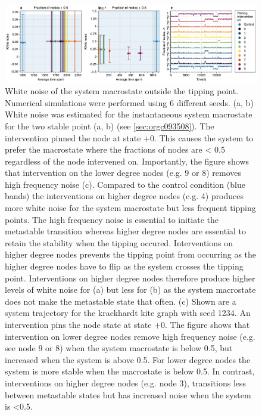 \documentclass[a4paper, 11pt, twocolumn]{article}
\begin{document}
\begin{figure}
\centering
\includegraphics[width=.9\linewidth]{./figures/figure4.pdf}
\caption{\label{fig:kite_noise}White noise of the system macrostate outside the tipping point. Numerical simulations were performed using 6 different seeds. (a, b) White noise was estimated for the instantaneous system macrostate for the two stable point (a, b) (see \ref{sec:orgc093508}). The intervention pinned the node at state +0. This causes the system to prefer the macrostate where the fractions of nodes are < 0.5 regardless of the node intervened on. Importantly, the figure shows that intervention on the lower degree nodes (e.g. 9 or 8) removes high frequency noise (c). Compared to the control condition (blue bands) the interventions on higher degree nodes (e.g. 4) produces more white noise for the system macrostate but less frequent tipping points.  The high frequency noise is essential to initiate the metastable transition whereas higher degree nodes are essential to retain the stability when the tipping occured. Interventions on higher degree nodes prevents the tipping point from occurring as the higher degree nodes have to flip as the system crosses the tipping point. Interventions on higher degree nodes therefore produce higher levels of white noise for (a) but less for (b) as the system macrostate does not make the metastable state that often. (c) Shown are a system trajectory for the krackhardt kite graph with seed 1234. An intervention pins the node state at state +0. The figure shows that intervention on lower degree nodes remove high frequency noise (e.g. see node 9 or 8) when the system macrostate is below 0.5, but increased when the system is above 0.5. For lower degree nodes the system is more stable when the macrostate is below 0.5. In contrast, interventions on higher degree nodes (e.g. node 3), transitions less between metastable states but has increased noise when the system is <0.5.}
\end{figure}
\end{document}
